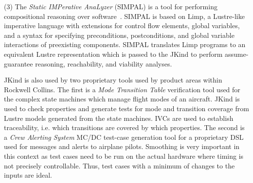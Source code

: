 \documentclass{llncs}
\newcommand{\jkind}{{\sc JKind}\xspace}
\newcommand{\lustre}{{\sc Lustre}\xspace}
\newcommand{\simpal}{{\sc SIMPAL}\xspace}
\newcommand{\limp}{{\sc Limp}\xspace}
\renewcommand{\paragraph}[1]{\vspace{5pt}\noindent {\bf #1}}
\newcommand{\application}[2]{
  \paragraph{#1} \hfill {\it #2}
  \vspace{1pt}
}
\begin{document}
(3) The {\em Static IMPerative AnaLyzer} (\simpal) is a tool for
performing compositional reasoning over
software~\cite{wagner2017spin}. \simpal is based on \limp, a \lustre-like imperative language with extensions for control flow elements, global variables, and a syntax for specifying preconditions, postconditions, and global variable interactions of
preexisting components. \simpal translates \limp programs to an
equivalent \lustre representation which is passed to the \jkind to
perform assume-guarantee reasoning, reachability, and viability
analyses. %

\jkind is also used by two proprietary tools used by product areas within Rockwell Collins.  The first is a {\em Mode Transition Table} verification tool used for the complex state machines which manage flight modes of an aircraft.
\jkind is used to check properties and generate tests for mode and transition coverage from \lustre models generated from the state machines.
IVCs are used to establish traceability, i.e. which transitions are covered by which properties.  The second is a {\em Crew Alerting System} MC/DC test-case generation tool for a proprietary DSL used for messages and alerts to airplane pilots.  Smoothing is very important in this context as test cases need to be run on the actual hardware where
timing is not precisely controllable. Thus, test cases with a minimum
of changes to the inputs are ideal.
%
%


\end{document}
